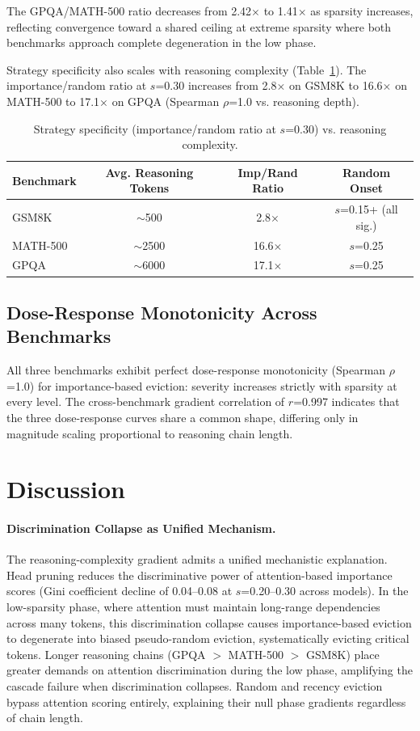 \documentclass[11pt,a4paper]{article}
\begin{document}
The GPQA/MATH-500 ratio decreases from 2.42$\times$ to 1.41$\times$ as sparsity increases, reflecting convergence toward a shared ceiling at extreme sparsity where both benchmarks approach complete degeneration in the low phase.

Strategy specificity also scales with reasoning complexity (Table~\ref{tab:specificity_gradient}). The importance/random ratio at $s$=0.30 increases from 2.8$\times$ on GSM8K to 16.6$\times$ on MATH-500 to 17.1$\times$ on GPQA (Spearman $\rho$=1.0 vs. reasoning depth).

\begin{table}[h]
\centering
\caption{Strategy specificity (importance/random ratio at $s$=0.30) vs. reasoning complexity.}
\label{tab:specificity_gradient}
\begin{tabular}{lccc}
\toprule
Benchmark & Avg. Reasoning Tokens & Imp/Rand Ratio & Random Onset \\
\midrule
GSM8K & $\sim$500 & 2.8$\times$ & $s$=0.15+ (all sig.) \\
MATH-500 & $\sim$2500 & 16.6$\times$ & $s$=0.25 \\
GPQA & $\sim$6000 & 17.1$\times$ & $s$=0.25 \\
\bottomrule
\end{tabular}
\end{table}

\subsection{Dose-Response Monotonicity Across Benchmarks}

All three benchmarks exhibit perfect dose-response monotonicity (Spearman $\rho$=1.0) for importance-based eviction: severity increases strictly with sparsity at every level. The cross-benchmark gradient correlation of $r$=0.997 indicates that the three dose-response curves share a common shape, differing only in magnitude scaling proportional to reasoning chain length.

\section{Discussion}

\paragraph{Discrimination Collapse as Unified Mechanism.}
The reasoning-complexity gradient admits a unified mechanistic explanation. Head pruning reduces the discriminative power of attention-based importance scores (Gini coefficient decline of 0.04--0.08 at $s$=0.20--0.30 across models). In the low-sparsity phase, where attention must maintain long-range dependencies across many tokens, this discrimination collapse causes importance-based eviction to degenerate into biased pseudo-random eviction, systematically evicting critical tokens. Longer reasoning chains (GPQA $>$ MATH-500 $>$ GSM8K) place greater demands on attention discrimination during the low phase, amplifying the cascade failure when discrimination collapses. Random and recency eviction bypass attention scoring entirely, explaining their null phase gradients regardless of chain length.
\end{document}

